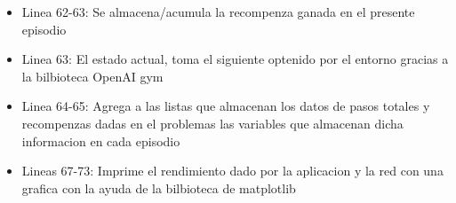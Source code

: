 \begin{itemize}
	\item Linea 62-63: Se almacena/acumula la recompenza ganada en el presente episodio 
	\item Linea 63: El estado actual, toma el siguiente optenido por el entorno gracias a la bilbioteca OpenAI gym
	\item Linea 64-65: Agrega a las listas que almacenan los datos de pasos totales y recompenzas dadas en el problemas las variables que almacenan dicha informacion en cada episodio
	\item Lineas 67-73: Imprime el rendimiento dado por la aplicacion y la red con una grafica con la ayuda de la bilbioteca de matplotlib
\end{itemize}


